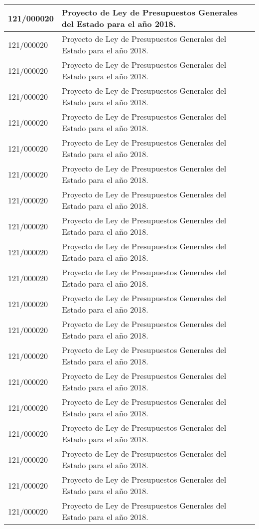 {\begin{table}[H]
\begin{center}
\begin{tabularx}{\linewidth}{| l | X |}
\hline
121/000020 & Proyecto de Ley de Presupuestos Generales del Estado para el año 2018. \\
\hline
121/000020 & Proyecto de Ley de Presupuestos Generales del Estado para el año 2018. \\
\hline
121/000020 & Proyecto de Ley de Presupuestos Generales del Estado para el año 2018. \\
\hline
121/000020 & Proyecto de Ley de Presupuestos Generales del Estado para el año 2018. \\
\hline
121/000020 & Proyecto de Ley de Presupuestos Generales del Estado para el año 2018. \\
\hline
121/000020 & Proyecto de Ley de Presupuestos Generales del Estado para el año 2018. \\
\hline
121/000020 & Proyecto de Ley de Presupuestos Generales del Estado para el año 2018. \\
\hline
121/000020 & Proyecto de Ley de Presupuestos Generales del Estado para el año 2018. \\
\hline
121/000020 & Proyecto de Ley de Presupuestos Generales del Estado para el año 2018. \\
\hline
121/000020 & Proyecto de Ley de Presupuestos Generales del Estado para el año 2018. \\
\hline
121/000020 & Proyecto de Ley de Presupuestos Generales del Estado para el año 2018. \\
\hline
121/000020 & Proyecto de Ley de Presupuestos Generales del Estado para el año 2018. \\
\hline
121/000020 & Proyecto de Ley de Presupuestos Generales del Estado para el año 2018. \\
\hline
121/000020 & Proyecto de Ley de Presupuestos Generales del Estado para el año 2018. \\
\hline
121/000020 & Proyecto de Ley de Presupuestos Generales del Estado para el año 2018. \\
\hline
121/000020 & Proyecto de Ley de Presupuestos Generales del Estado para el año 2018. \\
\hline
121/000020 & Proyecto de Ley de Presupuestos Generales del Estado para el año 2018. \\
\hline
121/000020 & Proyecto de Ley de Presupuestos Generales del Estado para el año 2018. \\
\hline
121/000020 & Proyecto de Ley de Presupuestos Generales del Estado para el año 2018. \\
\hline
121/000020 & Proyecto de Ley de Presupuestos Generales del Estado para el año 2018. \\

\end{tabularx}
\end{center}
\end{table}}
